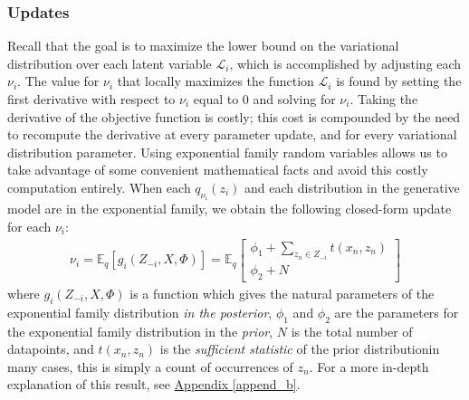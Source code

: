 \documentclass[12pt,letterpaper]{article}
\begin{document}
\subsubsection{Updates}
Recall that the goal is to maximize the lower bound on the variational distribution over each latent variable $\mathcal{L}_i$, which is accomplished by adjusting each $\nu_i$. The value for $\nu_i$ that locally maximizes the function $\mathcal{L}_i$ is found by setting the first derivative with respect to $\nu_i$ equal to 0 and solving for $\nu_i$. Taking the derivative of the objective function is costly; this cost is compounded by the need to recompute the derivative at every parameter update, and for every variational distribution parameter. Using exponential family random variables allows us to take advantage of some convenient mathematical facts and avoid this costly computation entirely. When each $q_{\nu_i}(z_i)$ and each distribution in the generative model are in the exponential family, we obtain the following closed-form update for each $\nu_i$: 
\begin{align}
\nu_i = \mathbb{E}_q[g_i(Z_{-i}, X, \Phi)] = \mathbb{E}_q \begin{bmatrix} \phi_1 + \sum\limits_{z_n \in Z_{-i}} t(x_n, z_n) \\ \phi_2 + N \end{bmatrix}
\end{align}
where $g_i(Z_{-i}, X, \Phi)$ is a function which gives the natural parameters of the exponential family distribution \textit{in the posterior}, $\phi_1$ and $\phi_2$ are the parameters for the exponential family distribution in the \textit{prior}, $N$ is the total number of datapoints, and $t(x_n, z_n)$ is the \textit{sufficient statistic} of the prior distribution\textemdash in many cases, this is simply a count of occurrences of $z_n$. For a more in-depth explanation of this result, see \hyperref[append_b]{Appendix \ref*{append_b}}. 
\end{document}
